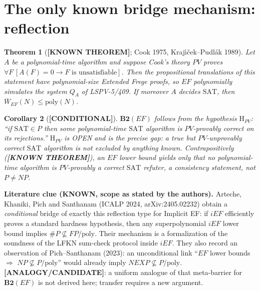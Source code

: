 \documentclass[11pt]{article}
\newtheorem{theorem}{Theorem}
\newtheorem{corollary}[theorem]{Corollary}
\theoremstyle{remark}
\newcommand{\SAT}{\mathrm{SAT}}
\newcommand{\poly}{\mathrm{poly}}
\newcommand{\Wb}{\overline W}
\newcommand{\status}[1]{\textbf{[#1]}}
\begin{document}
\section{The only known bridge mechanism: reflection}
\begin{theorem}[\status{KNOWN THEOREM}; Cook 1975, Kraj\'{\i}\v{c}ek--Pudl\'ak 1989]\label{thm:refl}
Let $A$ be a polynomial-time algorithm and suppose Cook's theory $PV$ proves
$\forall F\,[A(F)=0\rightarrow F\text{ is unsatisfiable}]$. Then the propositional translations of
this statement have polynomial-size Extended Frege proofs, so $EF$ polynomially simulates the
system $Q_A$ of LSPV-5/409. If moreover $A$ decides $\SAT$, then $\Wb_{EF}(N)\le\poly(N)$.
\end{theorem}
\begin{corollary}[\status{CONDITIONAL}]
$\mathbf{B2}(EF)$ follows from the hypothesis
$\mathrm{H}_{PV}$: ``if $\SAT\in P$ then some polynomial-time $\SAT$ algorithm is $PV$-provably
correct on its rejections.'' $\mathrm{H}_{PV}$ is OPEN and is the precise gap: a true but
$PV$-unprovably correct $\SAT$ algorithm is not excluded by anything known. Contrapositively
(\status{KNOWN THEOREM}), an $EF$ lower bound yields only that no polynomial-time algorithm is
$PV$-provably a correct $\SAT$ refuter, a consistency statement, not $P\ne NP$.
\end{corollary}
\noindent\textbf{Literature clue (KNOWN, scope as stated by the authors).} Arteche, Khaniki, Pich and
Santhanam (ICALP 2024, arXiv:2405.02232) obtain a \emph{conditional} bridge of exactly this
reflection type for Implicit EF: if $iEF$ efficiently proves a standard hardness hypothesis, then any
superpolynomial $iEF$ lower bound implies $\#P\not\subseteq FP/\mathrm{poly}$. Their mechanism
is a formalization of the soundness of the LFKN sum-check protocol inside $iEF$. They also record
an observation of Pich--Santhanam (2023): an unconditional link ``$EF$ lower bounds $\Rightarrow$
$NP\not\subseteq P/\mathrm{poly}$'' would already imply $NEXP\not\subseteq P/\mathrm{poly}$.
\status{ANALOGY/CANDIDATE}: a uniform analogue of that meta-barrier for $\mathbf{B2}(EF)$ is not
derived here; transfer requires a new argument.
\end{document}
